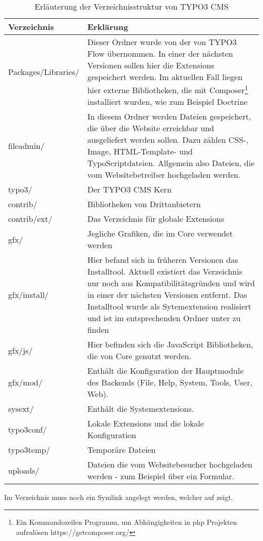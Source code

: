 \begin{table}
	\begin{tabularx}{\textwidth}{|X|X|}
		\hline
		Verzeichnis & Erklärung\\ \hline
		Packages/Libraries/ & Dieser Ordner wurde von der von TYPO3 Flow übernommen. In einer der nächsten Versionen sollen hier die Extensions gespeichert werden. Im aktuellen Fall liegen hier externe Bibliotheken, die mit Composer\footnote{Ein Kommandozeilen Programm, um Abhängigkeiten in \gls{php} Projekten aufzulösen https://getcomposer.org/} installiert wurden, wie zum Beispiel Doctrine\\ \hline
		fileadmin/ & In diesem Ordner werden Dateien gespeichert, die über die Website erreichbar und ausgeliefert werden sollen. Dazu zählen CSS-, Image, HTML-Template- und TypoScriptdateien. Allgemein also Dateien, die vom Websitebetreiber hochgeladen werden.\\ \hline
		typo3/ & Der TYPO3 CMS Kern\\ \hline
		contrib/ & Bibliotheken von Drittanbietern\\ \hline
		contrib/ext/ & Das Verzeichnis für globale Extensions \\ \hline
		gfx/ & Jegliche Grafiken, die im Core verwendet werden \\ \hline
		gfx/install/ & Hier befand sich in früheren Versionen das Installtool. Aktuell existiert das Verzeichnis nur noch aus Kompatibilitätsgründen und wird in einer der nächsten Versionen entfernt. Das Installtool wurde als Sytemextension realisiert und ist im entsprechenden Ordner unter \pdf{sysext/install/} zu finden\\ \hline
		gfx/js/ & Hier befinden sich die JavaScript Bibliotheken, die von Core genutzt werden.\\ \hline
		gfx/mod/ & Enthält die Konfiguration der Hauptmodule des Backends (File, Help, System, Tools, User, Web).\\ \hline
		sysext/ & Enthält die Systemextensions.\\ \hline
		typo3conf/ & Lokale Extensions und die lokale Konfiguration\\ \hline
		typo3temp/ & Temporäre Dateien\\ \hline
		uploads/ & Dateien die vom Websitebesucher hochgeladen werden - zum Beispiel über ein Formular.\\ \hline
	\end{tabularx}
	\caption{Erläuterung der Verzeichnisstruktur von TYPO3 CMS}
	\label{tab:typo3FolderStructure}
\end{table}
Im Verzeichnis  muss noch ein Symlink  angelegt werden, welcher auf  zeigt.

